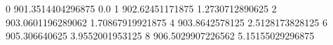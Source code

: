 0 901.3514404296875 0.0
1 902.62451171875 1.2730712890625
2 903.0601196289062 1.70867919921875
4 903.8642578125 2.5128173828125
6 905.306640625 3.9552001953125
8 906.5029907226562 5.15155029296875
